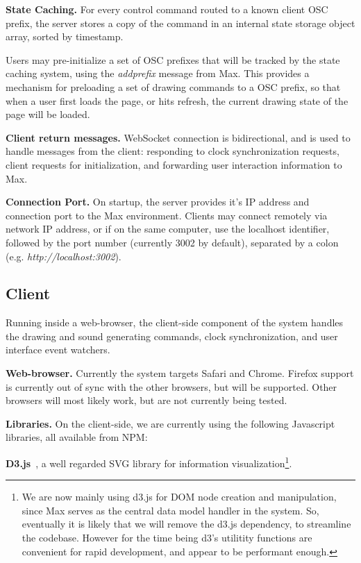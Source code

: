 \medskip
\noindent
\textbf{State Caching.}
For every control command routed to a known client OSC prefix, the server stores a copy of the command in an internal state storage object array, sorted by timestamp.

Users may pre-initialize a set of OSC prefixes that will be tracked by the state caching system, using the \textit{addprefix} message from Max.
This provides a mechanism for preloading a set of drawing commands to a OSC prefix, so that when a user first loads the page, or hits refresh, the current drawing state of the page will be loaded.

\medskip
\noindent
\textbf{Client return messages.}
WebSocket connection is bidirectional, and is used to handle messages from the client: responding to clock synchronization requests, client requests for initialization, and forwarding user interaction information to Max.

\medskip
\noindent
\textbf{Connection Port.} 
On startup, the server provides it's IP address and connection port to the Max environment.
Clients may connect remotely via network IP address, or if on the same computer, use the localhost identifier, followed by the port number (currently 3002 by default), separated by a colon (e.g. \textit{http://localhost:3002}).
 
 \subsection{Client}  
Running inside a web-browser, the client-side component of the \drawsocket system handles the drawing and sound generating commands, clock synchronization, and user interface event watchers.

\medskip
\noindent
\textbf{Web-browser.}  
Currently the system targets Safari and Chrome. 
Firefox support is currently out of sync with the other browsers, but will be supported. Other browsers will most likely work, but are not currently being tested.

\medskip
\noindent
\textbf{Libraries.}
On the client-side, we are currently using the following Javascript libraries, all available from NPM:

\textbf{D3.js}~\cite{d3}, a well regarded SVG library for information visualization\footnote{We are now mainly using d3.js for DOM node creation and manipulation, since Max serves as the central data model handler in the \drawsocket system. So, eventually it is likely that we will remove the d3.js dependency, to streamline the codebase. However for the time being d3's utilitity functions are convenient for rapid development, and appear to be performant enough.}.

